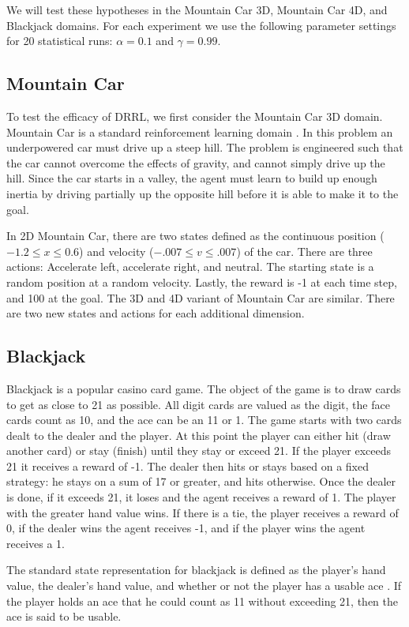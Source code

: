\documentclass[10pt,a4paper]{article}
\begin{document}
We will test these hypotheses in the Mountain Car 3D, Mountain Car 4D, and Blackjack domains. For each experiment we use the following parameter settings for 20 statistical runs: $\alpha = 0.1$ and $\gamma = 0.99$.
\subsection{Mountain Car}
To test the efficacy of DRRL, we first consider the Mountain Car 3D domain. Mountain Car is a standard reinforcement learning domain \cite{NIPSbench:05}. In this problem an underpowered car must drive up a steep hill. The problem is engineered such that the car cannot overcome the effects of gravity, and cannot simply drive up the hill. Since the car starts in a valley, the agent must learn to build up enough inertia by driving partially up the opposite hill before it is able to make it to the goal.

In 2D Mountain Car, there are two states defined as the continuous position ($-1.2 \leq x \leq 0.6$) and velocity ($-.007 \leq v \leq .007$) of the car. There are three actions: Accelerate left, accelerate right, and neutral. The starting state is a random position at a random velocity. Lastly, the reward is -1 at each time step, and 100 at the goal. The 3D and 4D variant of Mountain Car are similar. There are two new states and actions for each additional dimension. 

\subsection{Blackjack}
Blackjack is a popular casino card game. The object of the game is to draw cards to get as close to 21 as possible. All digit cards are valued as the digit, the face cards count as 10, and the ace can be an 11 or 1. The game starts with two cards dealt to the dealer and the player. At this point the player can either hit (draw another card) or stay (finish) until they stay or exceed 21. If the player exceeds 21 it receives a reward of -1. The dealer then hits or stays based on a fixed strategy: he stays on a sum of 17 or greater, and hits otherwise. Once the dealer is done, if it exceeds 21, it loses and the agent receives a reward of 1. The player with the greater hand value wins. If there is a tie, the player receives a reward of 0, if the dealer wins the agent receives -1, and if the player wins the agent receives a 1.

The standard state representation for blackjack is defined as the player's hand value, the dealer's hand value, and whether or not the player has a usable ace \cite{NIPSbench:05}. If the player holds an ace that he could count as 11 without exceeding 21, then the ace is said to be usable.
\end{document}
